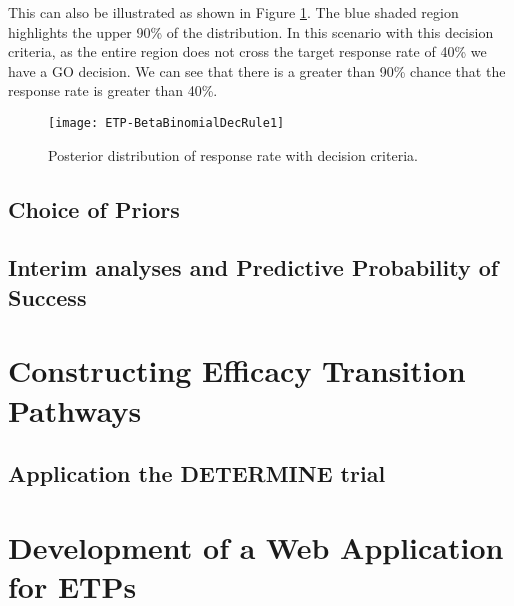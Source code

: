 This can also be illustrated as shown in Figure \ref{fig_etp:bb_dec_rule1}. The blue shaded region highlights the upper 90\% of the distribution. In this scenario with this decision criteria, as the entire region does not cross the target response rate of 40\% we have a GO decision. We can see that there is a greater than 90\% chance that the response rate is greater than 40\%. 

 \begin{figure}[h!]
 	\centering
 	\caption{Posterior distribution of response rate with decision criteria.}
 	\label{fig_etp:bb_dec_rule1}
 	\texttt{[image: ETP-BetaBinomialDecRule1]}
 \end{figure}




\subsection{Choice of Priors} 



\subsection{Interim analyses and Predictive Probability of Success}


\section{Constructing Efficacy Transition Pathways}


\subsection{Application the DETERMINE trial}


\section{Development of a Web Application for ETPs}